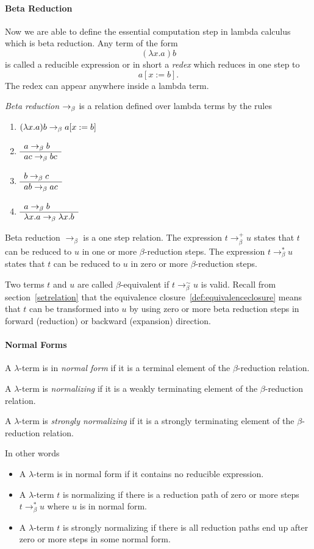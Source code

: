 \paragraph{Beta Reduction}

Now we are able to define the essential computation step in lambda calculus
which is beta reduction. Any term of the form
$$ (\lambda x.a) b$$ is called a reducible expression or in short a
\emph{redex} which reduces in one step to
$$a[x:=b].$$ The redex can appear anywhere inside a lambda term.

\begin{definition} \emph{Beta reduction} $\to_\beta$ is a relation defined over lambda
  terms by the rules
  \begin{enumerate}
  \item $(\lambda x.a) b \to_\beta a[x := b]$
  \item $\begin{array}{l} a\to_\beta b \\ \hline a c \to_\beta b c\end{array}$
  \item $\begin{array}{l} b\to_\beta c \\ \hline a b \to_\beta a c\end{array}$
  \item $\begin{array}{l} a \to_\beta b \\ \hline \lambda x.a \to_\beta \lambda x.b\end{array}$
  \end{enumerate}
\end{definition}

Beta reduction $\to_\beta$ is a one step relation. The expression
$t \to_\beta^+ u $ states that $t$ can be reduced to $u$ in one or more
$\beta$-reduction steps.  The expression $t \to_\beta^* u $ states that $t$
can be reduced to $u$ in zero or more $\beta$-reduction steps.

Two terms $t$ and $u$ are called $\beta$-equivalent if $t \to_\beta^\sim u$ is
valid. Recall from section~\ref{setrelation} that the equivalence
closure~\ref{def:equivalenceclosure} means that $t$ can be transformed into
$u$ by using zero or more beta reduction steps in forward (reduction) or
backward (expansion) direction.

\paragraph{Normal Forms}

\begin{definition}
  A $\lambda$-term is in \emph{normal form} if it is a terminal element of the
  $\beta$-reduction relation.

  A $\lambda$-term is \emph{normalizing} if it is a weakly terminating element of the
  $\beta$-reduction relation.

  A $\lambda$-term is \emph{strongly normalizing} if it is a strongly
  terminating element of the $\beta$-reduction relation.
\end{definition}
In other words
\begin{itemize}
\item A $\lambda$-term is in normal form if it contains no reducible expression.
\item A $\lambda$-term $t$ is normalizing if there is a reduction path of zero
  or more steps $t \to_\beta^* u$ where $u$ is in normal form.
\item A $\lambda$-term $t$ is strongly normalizing if there is all reduction
  paths end up after zero or more steps in some normal form.
\end{itemize}

